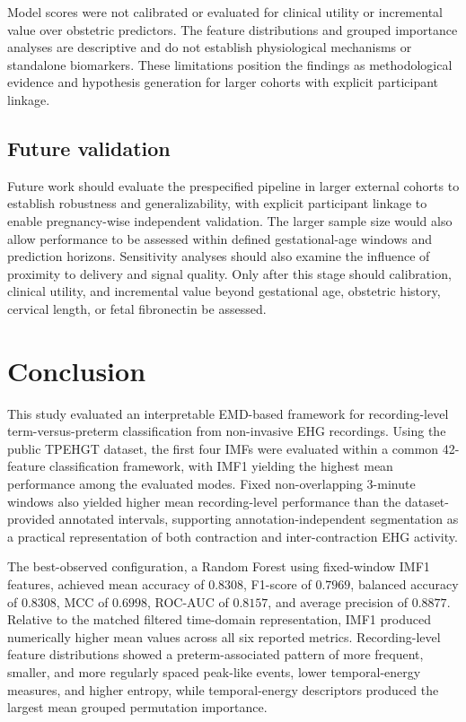 \documentclass[10pt,letterpaper]{article}
\begin{document}
Model scores were not calibrated or evaluated for clinical utility or incremental value over obstetric predictors. The feature distributions and grouped importance analyses are descriptive and do not establish physiological mechanisms or standalone biomarkers. These limitations position the findings as methodological evidence and hypothesis generation for larger cohorts with explicit participant linkage.

\subsection*{Future validation}
Future work should evaluate the prespecified pipeline in larger external cohorts to establish robustness and generalizability, with explicit participant linkage to enable pregnancy-wise independent validation. The larger sample size would also allow performance to be assessed within defined gestational-age windows and prediction horizons. Sensitivity analyses should also examine the influence of proximity to delivery and signal quality. Only after this stage should calibration, clinical utility, and incremental value beyond gestational age, obstetric history, cervical length, or fetal fibronectin be assessed.


\section*{Conclusion}

This study evaluated an interpretable EMD-based framework for recording-level term-versus-preterm classification from non-invasive EHG recordings. Using the public TPEHGT dataset, the first four IMFs were evaluated within a common 42-feature classification framework, with IMF1 yielding the highest mean performance among the evaluated modes. Fixed non-overlapping 3-minute windows also yielded higher mean recording-level performance than the dataset-provided annotated intervals, supporting annotation-independent segmentation as a practical representation of both contraction and inter-contraction EHG activity.

The best-observed configuration, a Random Forest using fixed-window IMF1 features, achieved mean accuracy of $0.8308$, F1-score of $0.7969$, balanced accuracy of $0.8308$, MCC of $0.6998$, ROC-AUC of $0.8157$, and average precision of $0.8877$. Relative to the matched filtered time-domain representation, IMF1 produced numerically higher mean values across all six reported metrics. Recording-level feature distributions showed a preterm-associated pattern of more frequent, smaller, and more regularly spaced peak-like events, lower temporal-energy measures, and higher entropy, while temporal-energy descriptors produced the largest mean grouped permutation importance.
\end{document}
